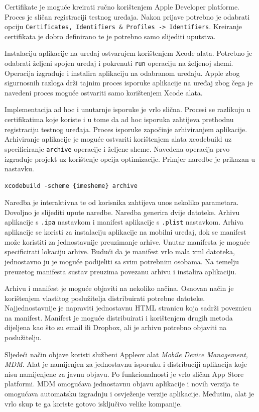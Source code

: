 \documentclass[times, utf8, diplomski, numeric]{fer}
\begin{document}
\begin{appendices}
Certifikate je moguće kreirati ručno korištenjem Apple Developer platforme. Proces je sličan registraciji testnog uređaja. Nakon prijave potrebno je odabrati opciju \verb|Certificates, Identifiers & Profiles -> Identifiers|. Kreiranje certifikata je dobro definirano te je potrebno samo slijediti uputstva.

Instalaciju aplikacije na uređaj ostvarujem korištenjem Xcode alata. Potrebno je odabrati željeni spojen uređaj i pokrenuti \verb|run| operaciju na željenoj shemi. Operacija izgrađuje i instalira aplikaciju na odabranom uređaju. Apple zbog sigurnosnih razloga drži tajnim proces isporuke aplikacije na uređaj zbog čega je navedeni proces moguće ostvariti samo korištenjem Xcode alata.

Implementacija ad hoc i unutarnje isporuke je vrlo slična. Procesi se razlikuju u certifikatima koje koriste i u tome da ad hoc isporuka zahtijeva prethodnu registraciju testnog uređaja. Proces isporuke započinje arhiviranjem aplikacije. Arhiviranje aplikacije je moguće ostvariti korištenjem alata xcodebuild uz specificiranje \verb|archive| operacije i željene sheme. Navedena operacija prvo izgrađuje projekt uz korištenje opcija optimizacije. Primjer naredbe je prikazan u nastavku.

\begin{verbatim}
xcodebuild -scheme {imesheme} archive
\end{verbatim}

Naredba je interaktivna te od korisnika zahtijeva unos nekoliko parametara. Dovoljno je slijediti upute naredbe. Naredba generira dvije datoteke. Arhivu aplikacije s \verb|.ipa| nastavkom i manifest aplikacije s \verb|.plist| nastavkom. Arhiva aplikacije se koristi za instalaciju aplikacije na mobilni uređaj, dok se manifest može koristiti za jednostavnije preuzimanje arhive. Unutar manifesta je moguće specificirati lokaciju arhive. Budući da je manifest vrlo mala xml datoteka, jednostavno ju je moguće podijeliti sa svim potrebnim osobama. Na temelju preuzetog manifesta sustav preuzima povezanu arhivu i instalira aplikaciju.

Arhivu i manifest je moguće objaviti na nekoliko načina. Osnovan način je korištenjem vlastitog poslužitelja distribuirati potrebne datoteke. Najjednostavnije je napraviti jednostavnu HTML stranicu koja sadrži poveznicu na manifest. Manifest je moguće distribuirati i korištenjem drugih metoda dijeljena kao što su email ili Dropbox, ali je arhivu potrebno objaviti na poslužitelju.

Sljedeći način objave koristi službeni Appleov alat \textit{Mobile Device Management, MDM}. Alat je namijenjen za jednostavnu isporuku i distribuciji aplikacija koje nisu namijenjene za javnu objavu. Po funkcionalnosti je vrlo sličan App Store platformi. MDM omogućava jednostavnu objavu aplikacije i novih verzija te omogućava automatsku izgradnju i osvježenje verzije aplikacije. Međutim, alat je vrlo skup te ga koriste gotovo isključivo velike kompanije.


\end{appendices}
\end{document}

